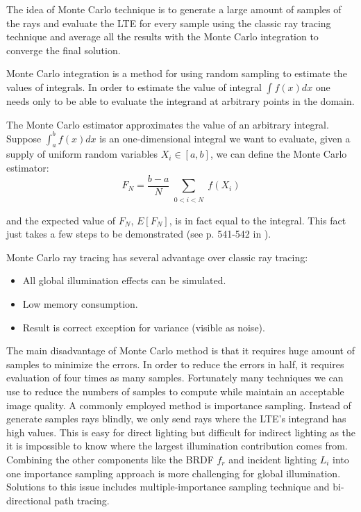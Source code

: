 The idea of Monte Carlo technique is to generate a large amount of samples of the rays and evaluate the LTE for every sample using the classic ray tracing technique and average all the results with the Monte Carlo integration to converge the final solution. 

Monte Carlo integration is a method for using random sampling to estimate the values of integrals. In order to estimate the value of integral \( \int f(x)dx \) one needs only to be able to evaluate the integrand at arbitrary points in the domain. 

The Monte Carlo estimator approximates the value of an arbitrary integral. Suppose \( \int_{a}^{b}f(x)dx \) is an one-dimensional integral we want to evaluate, given a supply of uniform random variables \( X_{i} \in [a, b] \), we can define the Monte Carlo estimator: 
\begin{equation}
F_{N} = \frac{b-a}{N}\sum_{\substack{0<i<N}}f(X_{i})
\end{equation}

and the expected value of \(F_{N}\), \(E[F_{N}]\), is in fact equal to the integral. This fact just takes a few steps to be demonstrated (see p. 541-542 in \cite{Pharr:2010:PBR:1854996}). 

Monte Carlo ray tracing has several advantage over classic ray tracing: 

\begin{itemize} 

\item All global illumination effects can be simulated.

\item Low memory consumption. 

\item Result is correct exception for variance (visible as noise). 

\end{itemize} 

The main disadvantage of Monte Carlo method is that it requires huge amount of samples to minimize the errors. In order to reduce the errors in half, it requires evaluation of four times as many samples. Fortunately many techniques we can use to reduce the numbers of samples to compute while maintain an acceptable image quality. A commonly employed method is importance sampling. Instead of generate samples rays blindly, we only send rays where the LTE's integrand has high values. This is easy for direct lighting but difficult for indirect lighting as the it is impossible to know where the largest illumination contribution comes from. Combining the other components like the BRDF \(f_{r}\) and incident lighting \(L_{i}\) into one importance sampling approach is more challenging for global illumination. Solutions to this issue includes multiple-importance sampling technique and bi-directional path tracing\cite{Lafortune93bi-directionalpath}.

